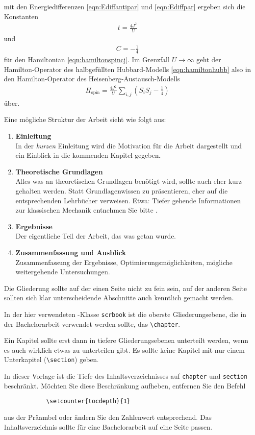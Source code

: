 mit den Energiedifferenzen \eqref{eqn:Ediffantipar} und \eqref{eqn:Ediffpar} ergeben sich die Konstanten
\begin{align}
  t = \frac{4 J^2}{U}
\end{align}
und
\begin{align}
  C = -\frac14
\end{align}
für den Hamiltonian \eqref{eqn:hamiltonspincj}.
Im Grenzfall $U \to \infty$ geht der Hamilton-Operator des halbgefüllten Hubbard-Modells \eqref{eqn:hamiltonhubb} also in den Hamilton-Operator des Heisenberg-Austausch-Modells
\begin{align}
  H_\text{spin} = \frac{4 J^2}{U} \sum_{i,j} (S_i S_j - \frac14)
  \label{eqn:hamiltonspin}
\end{align}
über.

Eine mögliche Struktur der Arbeit sieht wie folgt aus:

\begin{enumerate}
    \item \textbf{Einleitung}\\
        In der \emph{kurzen} Einleitung wird die Motivation für die Arbeit
        dargestellt und ein Einblick in die kommenden Kapitel gegeben.
    \item \textbf{Theoretische Grundlagen}\\
        Alles was an theoretischen Grundlagen benötigt wird, sollte auch eher kurz gehalten werden.
        Statt Grundlagenwissen zu präsentieren, eher auf die entsprechenden Lehrbücher verweisen.
        Etwa: Tiefer gehende Informationen zur klassischen Mechanik entnehmen Sie bitte \cite{kuypers}.
    \item \textbf{Ergebnisse} \\
        Der eigentliche Teil der Arbeit, das was getan wurde.
    \item \textbf{Zusammenfassung und Ausblick} \\
        Zusammenfassung der Ergebnisse, Optimierungsmöglichkeiten, mögliche weitergehende Untersuchungen.
\end{enumerate}

Die Gliederung sollte auf der einen Seite nicht zu fein sein, auf der anderen Seite
sollten sich klar unterscheidende Abschnitte auch kenntlich gemacht werden.

In der hier verwendeten \KOMAScript-Klasse \texttt{scrbook} ist die oberste Gliederungsebene,
die in der Bachelorarbeit verwendet werden sollte, das \texttt{\textbackslash chapter}.

Ein Kapitel sollte erst dann in tiefere Gliederungsebenen unterteilt werden, wenn es auch wirklich etwas zu unterteilen gibt. Es sollte keine Kapitel mit nur einem Unterkapitel (\texttt{\textbackslash section}) geben.

In dieser Vorlage ist die Tiefe des Inhaltsverzeichnisses auf \texttt{chapter} und \texttt{section} beschränkt. Möchten Sie diese Beschränkung aufheben, entfernen Sie den Befehl
\begin{verbatim}
            \setcounter{tocdepth}{1}
\end{verbatim}
aus der Präambel oder ändern Sie den Zahlenwert entsprechend. Das Inhaltsverzeichnis sollte für eine Bachelorarbeit auf eine Seite passen.
